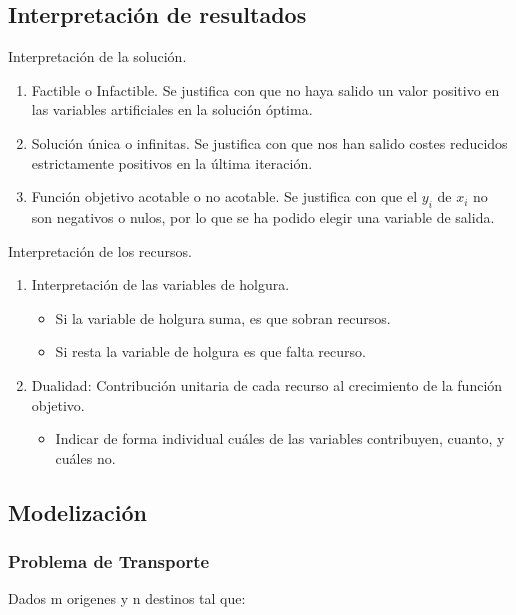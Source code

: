 \documentclass[12pt, twoside, openright]{report} %
\begin{document}
\subsection{Interpretación de resultados}

Interpretación de la solución.

\begin{enumerate}
	\item Factible o Infactible. Se justifica con que no haya salido un valor positivo en las variables artificiales en la solución óptima.
	\item Solución única o infinitas. Se justifica con que nos han salido
	costes reducidos estrictamente positivos en la última iteración.
 	\item Función objetivo acotable o no acotable. Se justifica con que el
	\(y_i\) de \(x_i\) no son negativos o nulos, por lo que se ha
	podido elegir una variable de salida.
\end{enumerate}

Interpretación de los recursos.

\begin{enumerate}
	\item Interpretación de las variables de holgura.
	\begin{itemize}
		\item Si la variable de holgura suma, es que sobran recursos.
		\item Si resta la variable de holgura es que falta recurso.
	\end{itemize}
	\item Dualidad: Contribución unitaria de cada recurso al crecimiento de
	la función objetivo.

	\begin{itemize}
	\item Indicar de forma individual cuáles de las variables contribuyen,
		cuanto, y cuáles no.
	\end{itemize}
\end{enumerate}
\pagebreak
\subsection{Modelización}

\subsubsection{Problema de Transporte}
Dados m origenes y n destinos tal que:
\begin{itemize*}
  \item 
\end{itemize*}
\end{document}
